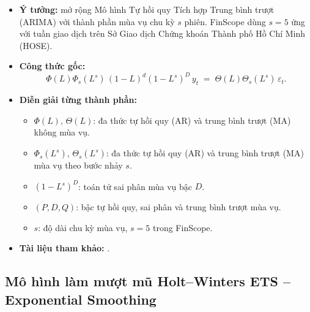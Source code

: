 \documentclass[12pt,a4paper,openany,oneside]{report}
\numberwithin{equation}{chapter}
\begin{document}
\begin{itemize}[leftmargin=18pt,topsep=2pt,itemsep=4pt]
  \item \textbf{Ý tưởng:} mở rộng Mô hình Tự hồi quy Tích hợp Trung
        bình trượt (ARIMA) với thành phần mùa vụ chu kỳ $s$ phiên.
        FinScope dùng $s = 5$ ứng với tuần giao dịch trên Sở Giao dịch
        Chứng khoán Thành phố Hồ Chí Minh (HOSE).
  \item \textbf{Công thức gốc:}
        \begin{equation}
          \Phi(L)\Phi_s(L^s)\,(1-L)^d(1-L^s)^D\, y_t
          \;=\; \Theta(L)\Theta_s(L^s)\,\varepsilon_t.
          \label{eq:sarima}
        \end{equation}
  \item \textbf{Diễn giải từng thành phần:}
        \begin{itemize}[leftmargin=14pt,topsep=2pt,itemsep=1pt]
          \item $\Phi(L),\,\Theta(L)$: đa thức tự hồi quy (AR) và trung
                bình trượt (MA) không mùa vụ.
          \item $\Phi_s(L^s),\,\Theta_s(L^s)$: đa thức tự hồi quy (AR)
                và trung bình trượt (MA) mùa vụ theo bước nhảy $s$.
          \item $(1-L^s)^D$: toán tử sai phân mùa vụ bậc $D$.
          \item $(P, D, Q)$: bậc tự hồi quy, sai phân và trung bình
                trượt mùa vụ.
          \item $s$: độ dài chu kỳ mùa vụ, $s = 5$ trong FinScope.
        \end{itemize}
  \item \textbf{Tài liệu tham khảo:} \citet{BoxJenkinsReinsel2008}.
\end{itemize}

\subsection{Mô hình làm mượt mũ Holt--Winters ETS -- Exponential Smoothing}
\end{document}
